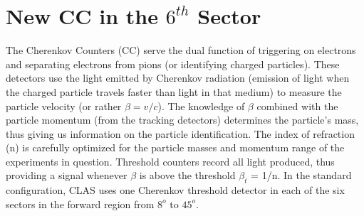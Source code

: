 \section{New CC in the $6^{th}$ Sector}
\label{newCCsec}
The Cherenkov Counters (CC) serve the dual function of triggering on electrons and separating electrons from pions (or identifying charged particles). These detectors use the light emitted by Cherenkov radiation (emission of light when the charged particle travels faster than light in that medium) to measure the particle velocity (or rather $\beta=v/c$). The knowledge of $\beta$ combined with the particle momentum (from the tracking detectors) determines the particle's mass, thus giving us information on %
the particle identification. %
The index of refraction (n) is carefully optimized for the particle masses and momentum range of the experiments in question. Threshold counters record all light produced, thus providing a signal whenever $\beta$ is above the threshold $\beta_t$ = 1/n. In the standard configuration, CLAS uses one Cherenkov threshold detector in each of the six sectors in the forward region from $8^o$ to $45^o$.

